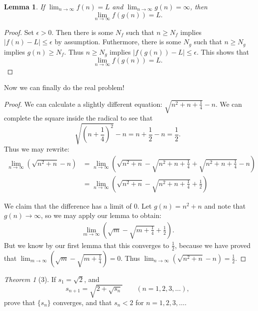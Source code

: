 \documentclass[12pt]{article}
\newtheorem*{lemma}{Lemma}
\theoremstyle{remark}
\theoremstyle{named}
\newtheorem*{theorem}{Theorem}
\begin{document}
\begin{lemma}
    If \(\lim_{n \to \infty} f(n) = L\) and \(\lim_{n \to \infty} g(n) = \infty\), then \[\lim_{n \to \infty} f(g(n)) = L.\]
\end{lemma}

\begin{proof}
    Set \(\epsilon > 0\). Then there is some \(N_f\) such that \(n \ge N_f\) implies \(|f(n) - L| \le \epsilon\) by assumption. Futhermore, there is some \(N_g\) such that \(n \ge N_g\) implies \(g(n) \ge N_f\). Thus \(n \ge N_g\) implies \(|f(g(n)) - L| \le \epsilon\). This shows that
    \[\lim_{n \to \infty} f(g(n)) = L.\]
\end{proof}

Now we can finally do the real problem!

\begin{proof}
    We can calculate a slightly different equation: \(\sqrt{n^2 + n + \frac{1}{4}} - n\). We can complete the square inside the radical to see that 
    \[\sqrt{\left(n + \frac{1}{4}\right)^2} - n = n + \frac{1}{2} - n = \frac{1}{2}.\]
    Thus we may rewrite:
    \begin{align*}
        \lim_{n \to \infty}(\sqrt{n^2 + n} - n) &= \lim_{n \to \infty}\left(\sqrt{n^2 + n} - \sqrt{n^2 + n + \frac{1}{4}} + \sqrt{n^2 + n + \frac{1}{4}} - n\right) \\ 
        &= \lim_{n \to \infty} \left(\sqrt{n^2 + n} - \sqrt{n^2 + n + \frac{1}{4}} + \frac{1}{2}\right)
    \end{align*}

    We claim that the difference has a limit of \(0\). Let \(g(n) = n^2 + n\) and note that \(g(n) \to \infty\), so we may apply our lemma to obtain:
    \begin{align*}
        \lim_{m \to \infty} \left(\sqrt{m} - \sqrt{m + \frac{1}{4}} + \frac{1}{2}\right).
    \end{align*}
    But we know by our first lemma that this converges to \(\frac{1}{2}\), because we have proved that \(\lim_{m \to \infty} \left(\sqrt{m} - \sqrt{m + \frac{1}{4}}\right) = 0\). Thus \(\lim_{n \to \infty} (\sqrt{n^2 + n} - n) = \frac{1}{2}\).
\end{proof}

\begin{theorem}[3]
    If \(s_1 = \sqrt 2\), and 
    \[s_{n + 1} = \sqrt{2 + \sqrt{s_n}} \hspace{2em} (n = 1, 2, 3, \dots),\]
    prove that \(\{s_n\}\) converges, and that \(s_n < 2\) for \(n = 1, 2, 3, \dots\).
\end{theorem}
\end{document}
